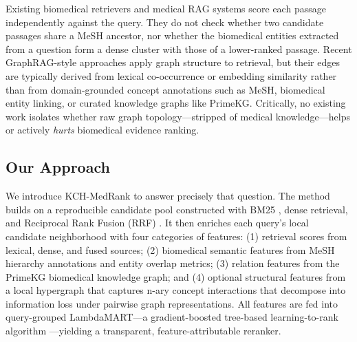Existing biomedical retrievers \citep{jin2023medcpt} and medical RAG systems \citep{xiong2024benchmarking,xiong2024imedrag} score each passage independently against the query. They do not check whether two candidate passages share a MeSH ancestor, nor whether the biomedical entities extracted from a question form a dense cluster with those of a lower-ranked passage. Recent GraphRAG-style approaches \citep{edge2024graphrag,wu2024medgraphrag,luo2025hypergraphrag} apply graph structure to retrieval, but their edges are typically derived from lexical co-occurrence or embedding similarity rather than from domain-grounded concept annotations such as MeSH, biomedical entity linking, or curated knowledge graphs like PrimeKG. Critically, no existing work isolates whether raw graph topology---stripped of medical knowledge---helps or actively \textit{hurts} biomedical evidence ranking.

\subsection*{Our Approach}

We introduce KCH-MedRank to answer precisely that question. The method builds on a reproducible candidate pool constructed with BM25 \citep{robertson2009bm25}, dense retrieval, and Reciprocal Rank Fusion (RRF) \citep{cormack2009rrf}. It then enriches each query's local candidate neighborhood with four categories of features: (1) retrieval scores from lexical, dense, and fused sources; (2) biomedical semantic features from MeSH hierarchy annotations and entity overlap metrics; (3) relation features from the PrimeKG biomedical knowledge graph; and (4) optional structural features from a local hypergraph that captures n-ary concept interactions that decompose into information loss under pairwise graph representations. All features are fed into query-grouped LambdaMART---a gradient-boosted tree-based learning-to-rank algorithm \citep{burges2010lambdamart}---yielding a transparent, feature-attributable reranker.

